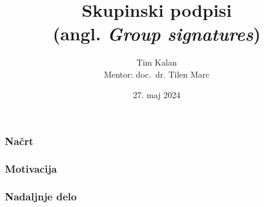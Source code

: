\documentclass{beamer}    %
\author{Tim Kalan \\ \medskip
        \footnotesize Mentor: doc.~dr. Tilen Marc}
\institute[FMF]{Fakulteta za matematiko in fiziko}
\title{
    Skupinski podpisi \\ 
    \large (angl. \textit{Group signatures})}
\date{27. maj 2024}
\begin{document}
\begin{frame}
    \titlepage
\end{frame}

\begin{frame}
    \frametitle{Načrt}
\end{frame}

\begin{frame}
    \frametitle{Motivacija}
\end{frame}

\begin{frame}
    \frametitle{Nadaljnje delo}
\end{frame}






\end{document}
